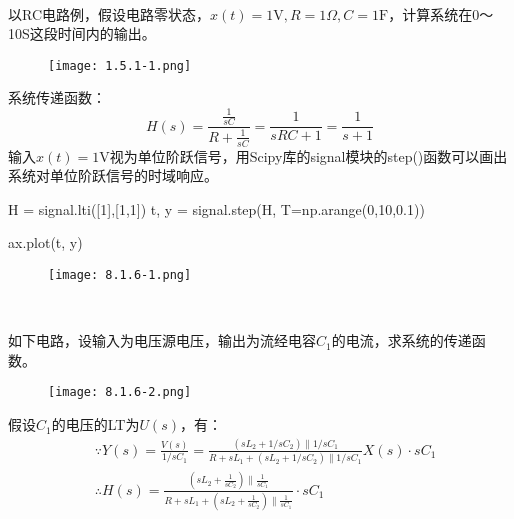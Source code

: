 ~

\begin{example}
以RC电路例，假设电路零状态，$x\left( t \right) =1\mathrm{V},R=1\Omega ,C=1\mathrm{F}$，计算系统在0～10S这段时间内的输出。
\begin{figure}[h]
\centering
\texttt{[image: 1.5.1-1.png]}
\end{figure}
\end{example}

系统传递函数：
\[
H\left( s \right) =\frac{\frac{1}{sC}}{R+\frac{1}{sC}}=\frac{1}{sRC+1}=\frac{1}{s+1}
\]
输入$x\left( t \right) =1\mathrm{V}$视为单位阶跃信号，用Scipy库的signal模块的step()函数可以画出系统对单位阶跃信号的时域响应。

\begin{python}
H    = signal.lti([1],[1,1])
t, y = signal.step(H, T=np.arange(0,10,0.1))

ax.plot(t, y)
\end{python}

\begin{figure}[h]
\centering
\texttt{[image: 8.1.6-1.png]}
\end{figure}

~

\begin{example}
如下电路，设输入为电压源电压，输出为流经电容$C_1$的电流，求系统的传递函数。
\begin{figure}[ht]
\centering
\texttt{[image: 8.1.6-2.png]}
\end{figure}
\end{example}

假设$C_1$的电压的LT为$U\left( s \right) $，有：
\begin{align*}
&\because Y\left( s \right) =\frac{V\left( s \right)}{1/sC_1}=\frac{\left( sL_2+1/sC_2 \right) \parallel 1/sC_1}{R+sL_1+\left( sL_2+1/sC_2 \right) \parallel 1/sC_1}X\left( s \right) \cdot sC_1 \\
&\therefore H\left( s \right) =\frac{\left( sL_2+\frac{1}{sC_2} \right) \parallel \frac{1}{sC_1}}{R+sL_1+\left( sL_2+\frac{1}{sC_2} \right) \parallel \frac{1}{sC_1}}\cdot sC_1
\end{align*}




